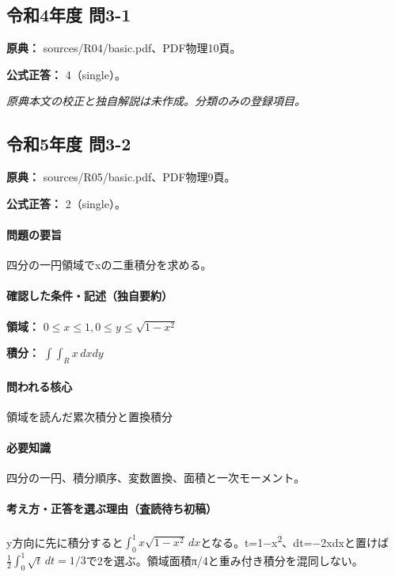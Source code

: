 \subsection{令和4年度 問3-1}
\label{q:r04-reg-basic-3-1}

\noindent\textbf{原典：} sources/R04/basic.pdf、PDF物理10頁。

\textbf{公式正答：} 4（single）。

\par\textit{原典本文の校正と独自解説は未作成。分類のみの登録項目。}

\subsection{令和5年度 問3-2}
\label{q:r05-reg-basic-3-2}

\noindent\textbf{原典：} sources/R05/basic.pdf、PDF物理9頁。

\textbf{公式正答：} 2（single）。

\paragraph{問題の要旨} 四分の一円領域でxの二重積分を求める。

\paragraph{確認した条件・記述（独自要約）}\mbox{}\par

\noindent\textbf{領域：} \(0\le x\le1,0\le y\le\sqrt{1-x^2}\)\par

\noindent\textbf{積分：} \(\int\int_R x\,dxdy\)\par

\paragraph{問われる核心} 領域を読んだ累次積分と置換積分

\paragraph{必要知識} 四分の一円、積分順序、変数置換、面積と一次モーメント。

\paragraph{考え方・正答を選ぶ理由（査読待ち初稿）} y方向に先に積分すると\(\int_0^1x\sqrt{1-x^2}\,dx\)となる。t=\allowbreak{}1−x\textsuperscript{2}、dt=−2xdxと置けば\(\frac12\int_0^1\sqrt t\,dt=1/3\)で2を選ぶ。領域面積π/4と重み付き積分を混同しない。

